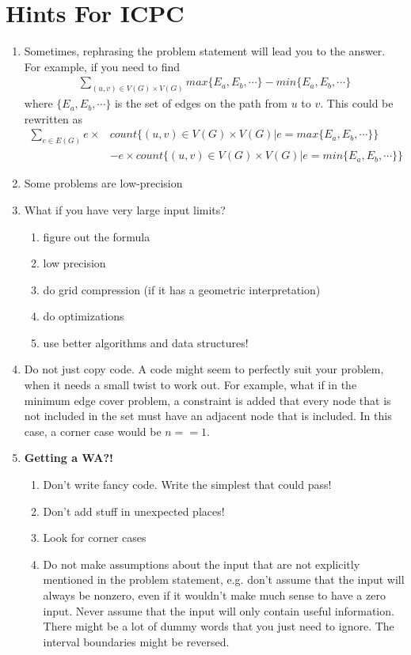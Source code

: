 \documentclass[12pt]{book}
\begin{document}
\section{Hints For ICPC}
\begin{enumerate}
\item Sometimes, rephrasing the problem statement will lead you to the answer. For example, if you need to find
\begin{align*}
\sum_{(u, v) \in V(G)\times V(G)} max\{E_a, E_b, \cdots\} - min\{E_a, E_b, \cdots\}
\end{align*}
where $\{E_a, E_b, \cdots\}$ is the set of edges on the path from $u$ to $v$. This could be rewritten as
\begin{align*}
\sum_{e\in E(G)}e \times & count\{(u, v) \in V(G) \times V(G) | e = max\{E_a, E_b, \cdots\}\}
\\
& - e \times count\{(u, v) \in V(G) \times V(G) | e = min\{E_a, E_b, \cdots\}\}
\end{align*}
\item Some problems are low-precision
\item What if you have very large input limits?
\begin{enumerate}
\item figure out the formula
\item low precision
\item do grid compression (if it has a geometric interpretation)
\item do optimizations
\item use better algorithms and data structures!
\end{enumerate}
\item Do not just copy code. A code might seem to perfectly suit your problem, when it needs a small twist to work out. For example, what if in the minimum edge cover problem, a constraint is added that every node that is not included in the set must have an adjacent node that is included. In this case, a corner case would be $n == 1$.
\item
\textbf{Getting a WA?!}
\begin{enumerate}[label = \roman*.]
\item Don't write fancy code. Write the simplest that could pass!
\item Don't add stuff in unexpected places!
\item Look for corner cases
\item Do not make assumptions about the input that are not explicitly mentioned in the problem statement, e.g. don't assume that the input will always be nonzero, even if it wouldn't make much sense to have a zero input. Never assume that the input will only contain useful information. There might be a lot of dummy words that you just need to ignore. The interval boundaries might be reversed.

\end{enumerate}
\end{enumerate}
\end{document}
